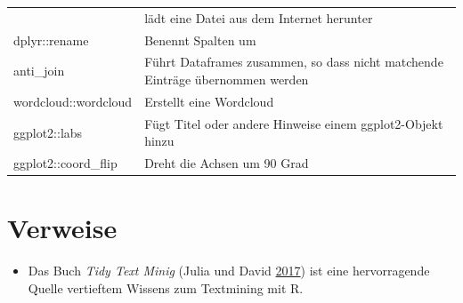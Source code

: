\documentclass[12pt,ngerman,]{book}
\providecommand{\tightlist}{%
  \setlength{\itemsep}{0pt}\setlength{\parskip}{0pt}}
\begin{document}
\begin{longtable}[]{@{}ll@{}}
\begin{minipage}[t]{0.34\columnwidth}
\end{minipage} & \begin{minipage}[t]{0.42\columnwidth}\raggedright\strut
lädt eine Datei aus dem Internet herunter\strut
\end{minipage}\tabularnewline
\begin{minipage}[t]{0.34\columnwidth}\raggedright\strut
dplyr::rename\strut
\end{minipage} & \begin{minipage}[t]{0.42\columnwidth}\raggedright\strut
Benennt Spalten um\strut
\end{minipage}\tabularnewline
\begin{minipage}[t]{0.34\columnwidth}\raggedright\strut
anti\_join\strut
\end{minipage} & \begin{minipage}[t]{0.42\columnwidth}\raggedright\strut
Führt Dataframes zusammen, so dass nicht matchende Einträge übernommen
werden\strut
\end{minipage}\tabularnewline
\begin{minipage}[t]{0.34\columnwidth}\raggedright\strut
wordcloud::wordcloud\strut
\end{minipage} & \begin{minipage}[t]{0.42\columnwidth}\raggedright\strut
Erstellt eine Wordcloud\strut
\end{minipage}\tabularnewline
\begin{minipage}[t]{0.34\columnwidth}\raggedright\strut
ggplot2::labs\strut
\end{minipage} & \begin{minipage}[t]{0.42\columnwidth}\raggedright\strut
Fügt Titel oder andere Hinweise einem ggplot2-Objekt hinzu\strut
\end{minipage}\tabularnewline
\begin{minipage}[t]{0.34\columnwidth}\raggedright\strut
ggplot2::coord\_flip\strut
\end{minipage} & \begin{minipage}[t]{0.42\columnwidth}\raggedright\strut
Dreht die Achsen um 90 Grad\strut
\end{minipage}\tabularnewline
\bottomrule
\end{longtable}

\section{Verweise}\label{verweise}

\begin{itemize}
\tightlist
\item
  Das Buch \emph{Tidy Text Minig} (Julia und David
  \protect\hyperlink{ref-tidytextminig}{2017}) ist eine hervorragende
  Quelle vertieftem Wissens zum Textmining mit R.
\end{itemize}
\end{document}
